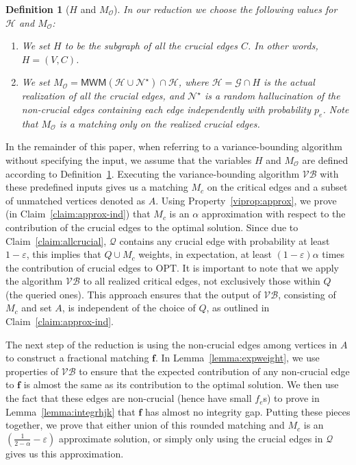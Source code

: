 \documentclass[letterpaper,11pt]{article}
\renewcommand{\epsilon}{\varepsilon}
\newcommand{\mc}[1]{\ensuremath{\mathcal{#1}}}
\newcommand{\opt}[0]{\text{OPT}}
\newcommand{\MM}[0]{{\textsf{MWM}}}
\newcommand{\VB}[0]{\ensuremath{\mathcal{VB}}}
\newcommand{\apx}[0]{\ensuremath{\mathcal{\alpha}}}
\renewcommand{\epsilon}[0]{\ensuremath{\varepsilon}}
\newtheorem{definition}[lemma]{Definition}
\renewcommand{\mc}[1]{\ensuremath{\mathcal{#1}}}
\begin{document}
\begin{definition}[$H$ and $M_{\mc{O}}$]\label{def:input}
In our reduction we choose the following values for $\mathcal{H}$ and $M_{\mc{O}}$:
\begin{enumerate}
    \item We set $H$ to be the subgraph of all the crucial edges $C$. In other words, $H=(V, C)$. \label{def:graphh}
    \item We set $M_{\mc{O}} = \MM(\mc{H}\cup \mc{N^\star})\cap \mc{H}$, where $\mc{H} = \mc{G}\cap H$ is the actual realization of all the crucial edges, and $\mc{N^\star}$ is a random hallucination of the non-crucial edges containing each edge independently with probability $p_e$. Note that $M_{\mc{O}}$ is a matching only on the realized crucial edges. \label{def:matchingMo}
\end{enumerate}
\end{definition}



In the remainder of this paper, when referring to a variance-bounding algorithm without specifying the input, we assume that the variables $H$ and $M_{\mc{O}}$ are defined according to Definition~\ref{def:input}. Executing the variance-bounding algorithm $\VB$ with these predefined inputs gives us a matching $M_c$ on the critical edges and a subset of unmatched vertices denoted as $A$. Using Property~\ref{viprop:approx}, we prove (in Claim~\ref{claim:approx-ind}) that $M_c$ is an $\alpha$ approximation with respect to the contribution of the crucial edges to the optimal solution. Since due to Claim~\ref{claim:allcrucial}, $\mc{Q}$ contains any crucial edge with probability at least $1-\epsilon$, this implies that $Q \cup M_c$ weights, in expectation, at least $(1-\epsilon)\apx$ times the contribution of crucial edges to $\opt$. It is important to note that we apply the algorithm $\VB$ to all realized critical edges, not exclusively those within $Q$ (the queried ones). This approach ensures that the output of $\VB$, consisting of $M_c$ and set $A$, is independent of the choice of $Q$, as outlined in Claim~\ref{claim:approx-ind}.

The next step of the reduction is using  the non-crucial edges among vertices in  $A$  to construct a fractional matching $\bm{f}$. In Lemma~\ref{lemma:expweight}, we use properties of  $\VB$ to ensure that the expected contribution of any non-crucial edge to $\bm{f}$ is almost the same as its contribution to the optimal solution. We then use the fact that these edges are non-crucial (hence have small $f_e$s) to prove in Lemma~\ref{lemma:integrhjk} that $\bm{f}$ has almost no integrity gap. Putting these pieces together, we prove that either union of this rounded matching and $M_c$ is an $(\frac{1}{2-\apx}-\epsilon)$ approximate solution, or simply only using the crucial edges in $\mc{Q}$ gives us this approximation.
\end{document}
